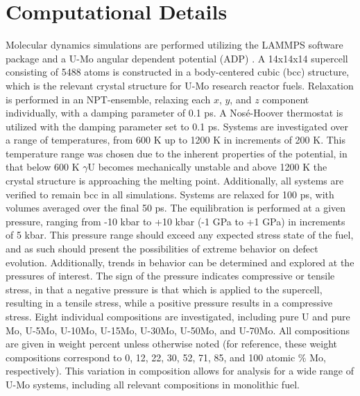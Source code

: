 \documentclass[default]{sn-jnl}%
\begin{document}
\section{Computational Details}\label{sec2}

Molecular dynamics simulations are performed utilizing the LAMMPS \cite{plimpton1995} software package and a U-Mo angular dependent potential (ADP) \cite{starikov2018}. A 14x14x14 supercell consisting of 5488 atoms is constructed in a body-centered cubic (bcc) structure, which is the relevant crystal structure for U-Mo research reactor fuels. Relaxation is performed in an NPT-ensemble, relaxing each $x$, $y$, and $z$ component individually, with a damping parameter of 0.1 ps. A Nos\'e-Hoover thermostat is utilized with the damping parameter set to 0.1 ps. Systems are investigated over a range of temperatures, from 600 K up to 1200 K in increments of 200 K. This temperature range was chosen due to the inherent properties of the potential, in that below 600 K $\gamma$U becomes mechanically unstable and above 1200 K the crystal structure is approaching the melting point. Additionally, all systems are verified to remain bcc in all simulations. Systems are relaxed for 100 ps, with volumes averaged over the final 50 ps. The equilibration is performed at a given pressure, ranging from -10 kbar to +10 kbar (-1 GPa to +1 GPa) in increments of 5 kbar. This pressure range should exceed any expected stress state of the fuel, and as such should present the possibilities of extreme behavior on defect evolution. Additionally, trends in behavior can be determined and explored at the pressures of interest. The sign of the pressure indicates compressive or tensile stress, in that a negative pressure is that which is applied to the supercell, resulting in a tensile stress, while a positive pressure results in a compressive stress. Eight individual compositions are investigated, including pure U and pure Mo, U-5Mo, U-10Mo, U-15Mo, U-30Mo, U-50Mo, and U-70Mo. All compositions are given in weight percent unless otherwise noted (for reference, these weight compositions correspond to 0, 12, 22, 30, 52, 71, 85, and 100 atomic \% Mo, respectively). This variation in composition allows for analysis for a wide range of U-Mo systems, including all relevant compositions in monolithic fuel.  
\end{document}
